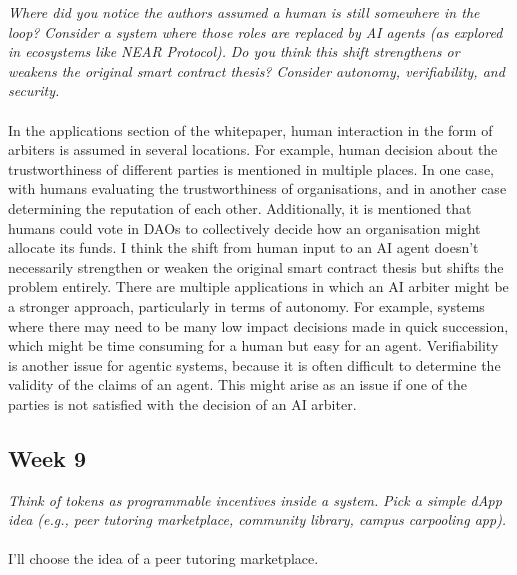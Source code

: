 \documentclass{article}
\theoremstyle{definition}
\begin{document}
\textit{Where did you notice the authors assumed a human is still somewhere in the loop?}
\textit{Consider a system where those roles are replaced by AI agents (as explored in ecosystems like NEAR Protocol).}
\textit{Do you think this shift strengthens or weakens the original smart contract thesis? Consider autonomy, verifiability, and security.}
\\
\\
\noindent
In the applications section of the whitepaper,
human interaction in the form of arbiters is assumed in several locations.
For example, human decision about the trustworthiness of different parties is mentioned in multiple places.
In one case, with humans evaluating the trustworthiness of organisations, and in another case determining the reputation of each other.
Additionally, it is mentioned that humans could vote in DAOs to collectively decide how an organisation might allocate its funds.
I think the shift from human input to an AI agent doesn't necessarily strengthen or weaken the original smart contract thesis
but shifts the problem entirely.
There are multiple applications in which an AI arbiter might be a stronger approach, particularly in terms of autonomy.
For example, systems where there may need to be many low impact decisions made in quick succession, 
which might be time consuming for a human but easy for an agent.
Verifiability is another issue for agentic systems, because it is often difficult to determine the validity of the claims of an agent.
This might arise as an issue if one of the parties is not satisfied with the decision of an AI arbiter.

\subsection{Week 9}

\textit{Think of tokens as programmable incentives inside a system.}
\textit{Pick a simple dApp idea (e.g., peer tutoring marketplace, community library, campus carpooling app).}
\\
\\
\noindent
I'll choose the idea of a peer tutoring marketplace.
\end{document}
